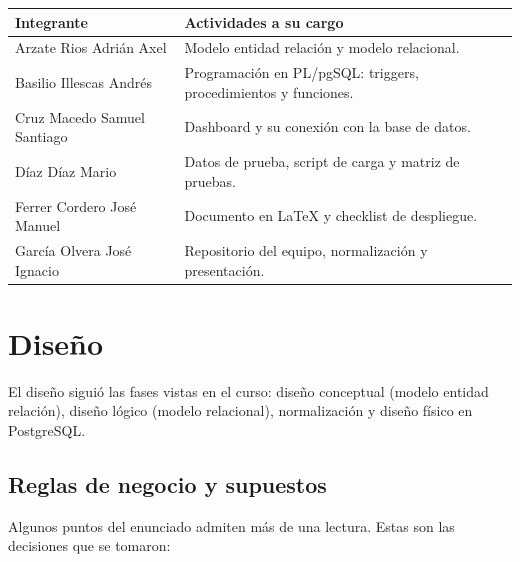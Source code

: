 \documentclass[12pt,a4paper]{article}
\begin{document}
\renewcommand{\arraystretch}{1.25}
\small
\begin{longtable}{@{}>{\raggedright\arraybackslash}p{5.2cm}
>{\raggedright\arraybackslash}p{\dimexpr\textwidth-5.2cm-2\tabcolsep\relax}@{}}
\toprule
\textbf{Integrante} & \textbf{Actividades a su cargo} \\
\midrule
\endhead
Arzate Rios Adrián Axel & Modelo entidad relación y modelo relacional. \\
Basilio Illescas Andrés & Programación en PL/pgSQL: triggers, procedimientos y funciones. \\
Cruz Macedo Samuel Santiago & Dashboard y su conexión con la base de datos. \\
Díaz Díaz Mario & Datos de prueba, script de carga y matriz de pruebas. \\
Ferrer Cordero José Manuel & Documento en LaTeX y checklist de despliegue. \\
García Olvera José Ignacio & Repositorio del equipo, normalización y presentación. \\
\bottomrule
\end{longtable}
\normalsize

\section{Diseño}

El diseño siguió las fases vistas en el curso: diseño conceptual (modelo entidad
relación), diseño lógico (modelo relacional), normalización y diseño físico en
PostgreSQL.

\subsection{Reglas de negocio y supuestos}

Algunos puntos del enunciado admiten más de una lectura. Estas son las decisiones
que se tomaron:
\end{document}
